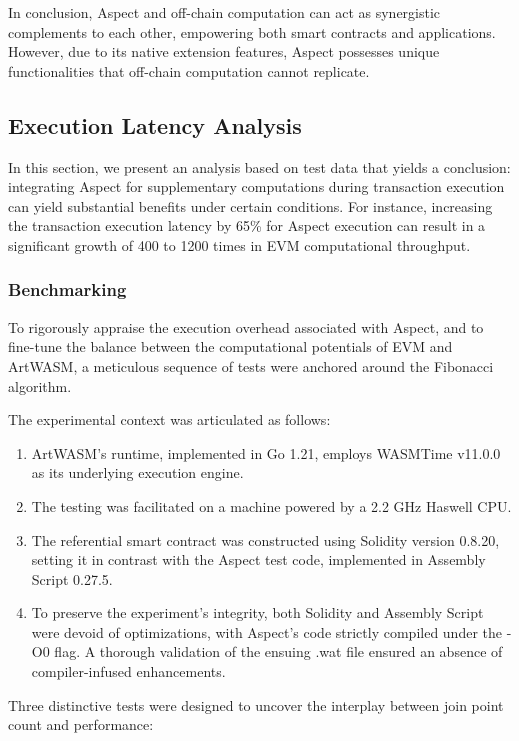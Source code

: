 In conclusion, Aspect and off-chain computation can act as synergistic complements to each other, empowering both smart contracts and applications. However, due to its native extension features, Aspect possesses unique functionalities that off-chain computation cannot replicate.

\subsection{Execution Latency Analysis}

In this section, we present an analysis based on test data that yields a conclusion: integrating Aspect for supplementary computations during transaction execution can yield substantial benefits under certain conditions. For instance, increasing the transaction execution latency by 65\% for Aspect execution can result in a significant growth of 400 to 1200 times in EVM computational throughput.

\subsubsection{Benchmarking}

To rigorously appraise the execution overhead associated with Aspect, and to fine-tune the balance between the computational potentials of EVM and ArtWASM, a meticulous sequence of tests were anchored around the Fibonacci algorithm.

The experimental context was articulated as follows:

\begin{enumerate}
  \item ArtWASM's runtime, implemented in Go 1.21, employs WASMTime v11.0.0 as its underlying execution engine.
  \item The testing was facilitated on a machine powered by a 2.2 GHz Haswell CPU.
  \item The referential smart contract was constructed using Solidity version 0.8.20, setting it in contrast with the Aspect test code, implemented in Assembly Script 0.27.5.
  \item To preserve the experiment's integrity, both Solidity and Assembly Script were devoid of optimizations, with Aspect's code strictly compiled under the -O0 flag. A thorough validation of the ensuing .wat file ensured an absence of compiler-infused enhancements.
\end{enumerate}

Three distinctive tests were designed to uncover the interplay between join point count and performance:

